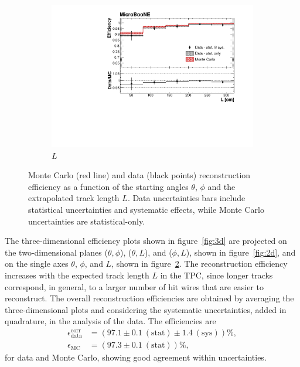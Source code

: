 \documentclass[a4paper,11pt]{article}
\begin{document}
\begin{figure}[htbp]
\begin{center}
\begin{subfigure}{0.61\textwidth}
      \includegraphics[width=\linewidth]{figures/l2.pdf}
      \caption{$L$} \label{fig:l}
    \end{subfigure}
    \caption{Monte Carlo (red line) and data (black points) reconstruction efficiency as a function of the starting angles $\theta$, $\phi$ and the extrapolated track length $L$. Data uncertainties bars include statistical uncertainties and systematic effects, while Monte Carlo uncertainties are statistical-only.}\label{fig:1d}
  \end{center}
\end{figure}

The three-dimensional efficiency plots shown in figure~\ref{fig:3d} are projected on the two-dimensional planes ($\theta,\phi$), ($\theta,L$), and ($\phi,L$), shown in figure~\ref{fig:2d}, and on the single axes $\theta$, $\phi$, and $L$, shown in figure~\ref{fig:1d}.
The reconstruction efficiency increases with the expected track length $L$ in the TPC, since longer tracks correspond, in general, to a larger number of hit wires that are easier to reconstruct.
The overall reconstruction efficiencies are obtained by averaging the three-dimensional plots and considering the systematic uncertainties, added in quadrature, in the analysis of the data. The efficiencies are
\begin{align}
\epsilon_{\mathrm{data}}^{\mathrm{corr}} &= (97.1 \pm 0.1~\mathrm{(stat)} \pm 1.4~\mathrm{(sys)})\%,\\
\epsilon_{\mathrm{MC}} &= (97.3 \pm 0.1~\mathrm{(stat)})\%,\nonumber
\end{align} for data and Monte Carlo, showing good agreement within uncertainties.
\end{document}
